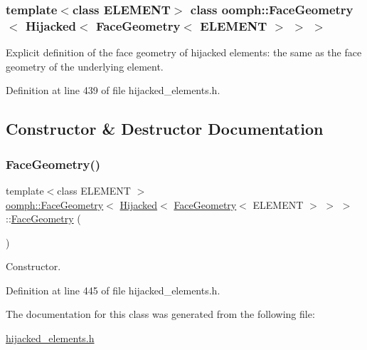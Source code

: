 \subsubsection*{template$<$class E\+L\+E\+M\+E\+NT$>$\newline
class oomph\+::\+Face\+Geometry$<$ Hijacked$<$ Face\+Geometry$<$ E\+L\+E\+M\+E\+N\+T $>$ $>$ $>$}

Explicit definition of the face geometry of hijacked elements\+: the same as the face geometry of the underlying element. 

Definition at line 439 of file hijacked\+\_\+elements.\+h.



\subsection{Constructor \& Destructor Documentation}
\mbox{\label{classoomph_1_1FaceGeometry_3_01Hijacked_3_01FaceGeometry_3_01ELEMENT_01_4_01_4_01_4_a2acbd5452df461b690cca240f5249647}} 
\subsubsection{\texorpdfstring{Face\+Geometry()}{FaceGeometry()}}
{\footnotesize\ttfamily template$<$class E\+L\+E\+M\+E\+NT $>$ \\
\hyperlink{classoomph_1_1FaceGeometry}{oomph\+::\+Face\+Geometry}$<$ \hyperlink{classoomph_1_1Hijacked}{Hijacked}$<$ \hyperlink{classoomph_1_1FaceGeometry}{Face\+Geometry}$<$ E\+L\+E\+M\+E\+NT $>$ $>$ $>$\+::\hyperlink{classoomph_1_1FaceGeometry}{Face\+Geometry} (\begin{DoxyParamCaption}{ }\end{DoxyParamCaption})\hspace{0.3cm}{\ttfamily [inline]}}



Constructor. 



Definition at line 445 of file hijacked\+\_\+elements.\+h.



The documentation for this class was generated from the following file\+:\begin{DoxyCompactItemize}
\item 
\hyperlink{hijacked__elements_8h}{hijacked\+\_\+elements.\+h}\end{DoxyCompactItemize}
